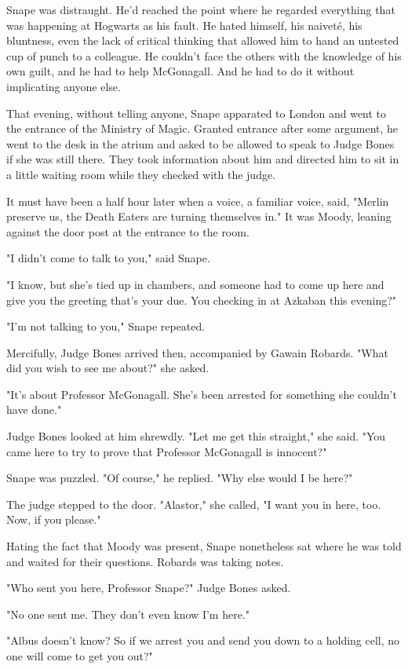 Snape was distraught. He'd reached the point where he regarded everything that was happening at Hogwarts as his fault. He hated himself, his naiveté, his bluntness, even the lack of critical thinking that allowed him to hand an untested cup of punch to a colleague. He couldn't face the others with the knowledge of his own guilt, and he had to help McGonagall. And he had to do it without implicating anyone else.

That evening, without telling anyone, Snape apparated to London and went to the entrance of the Ministry of Magic. Granted entrance after some argument, he went to the desk in the atrium and asked to be allowed to speak to Judge Bones if she was still there. They took information about him and directed him to sit in a little waiting room while they checked with the judge.

It must have been a half hour later when a voice, a familiar voice, said, "Merlin preserve us, the Death Eaters are turning themselves in." It was Moody, leaning against the door post at the entrance to the room.

"I didn't come to talk to you," said Snape.

"I know, but she's tied up in chambers, and someone had to come up here and give you the greeting that's your due. You checking in at Azkaban this evening?"

"I'm not talking to you," Snape repeated.

Mercifully, Judge Bones arrived then, accompanied by Gawain Robards. "What did you wish to see me about?" she asked.

"It's about Professor McGonagall. She's been arrested for something she couldn't have done."

Judge Bones looked at him shrewdly. "Let me get this straight," she said. "You came here to try to prove that Professor McGonagall is innocent?"

Snape was puzzled. "Of course," he replied. "Why else would I be here?"

The judge stepped to the door. "Alastor," she called, "I want you in here, too. Now, if you please."

Hating the fact that Moody was present, Snape nonetheless sat where he was told and waited for their questions. Robards was taking notes.

"Who sent you here, Professor Snape?" Judge Bones asked.

"No one sent me. They don't even know I'm here."

"Albus doesn't know? So if we arrest you and send you down to a holding cell, no one will come to get you out?"

